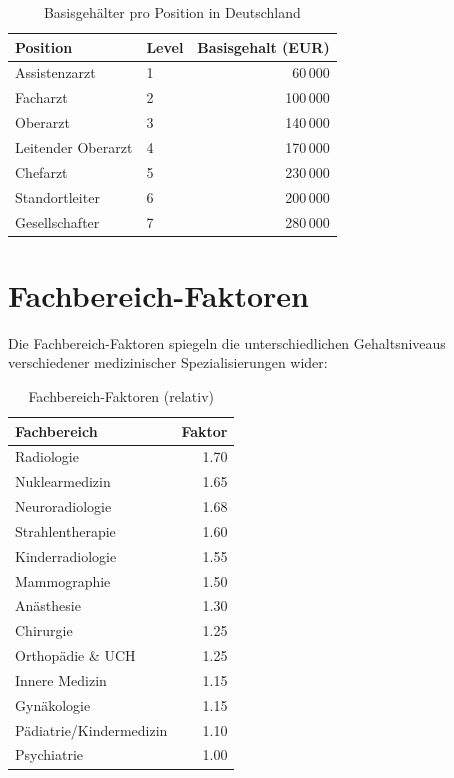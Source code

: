 \documentclass[12pt,a4paper]{article}
\begin{document}
\begin{table}[h]
\centering
\begin{tabular}{@{}llr@{}}
\toprule
\textbf{Position} & \textbf{Level} & \textbf{Basisgehalt (EUR)} \\
\midrule
Assistenzarzt & 1 & 60\,000 \\
Facharzt & 2 & 100\,000 \\
Oberarzt & 3 & 140\,000 \\
Leitender Oberarzt & 4 & 170\,000 \\
Chefarzt & 5 & 230\,000 \\
Standortleiter & 6 & 200\,000 \\
Gesellschafter & 7 & 280\,000 \\
\bottomrule
\end{tabular}
\caption{Basisgehälter pro Position in Deutschland}
\label{tab:positionen}
\end{table}

\section{Fachbereich-Faktoren}

Die Fachbereich-Faktoren spiegeln die unterschiedlichen Gehaltsniveaus verschiedener medizinischer Spezialisierungen wider:

\begin{table}[h]
\centering
\begin{tabular}{@{}lr@{}}
\toprule
\textbf{Fachbereich} & \textbf{Faktor} \\
\midrule
Radiologie & 1.70 \\
Nuklearmedizin & 1.65 \\
Neuroradiologie & 1.68 \\
Strahlentherapie & 1.60 \\
Kinderradiologie & 1.55 \\
Mammographie & 1.50 \\
Anästhesie & 1.30 \\
Chirurgie & 1.25 \\
Orthopädie \& UCH & 1.25 \\
Innere Medizin & 1.15 \\
Gynäkologie & 1.15 \\
Pädiatrie/Kindermedizin & 1.10 \\
Psychiatrie & 1.00 \\
\bottomrule
\end{tabular}
\caption{Fachbereich-Faktoren (relativ)}
\label{tab:fachbereiche}
\end{table}
\end{document}
